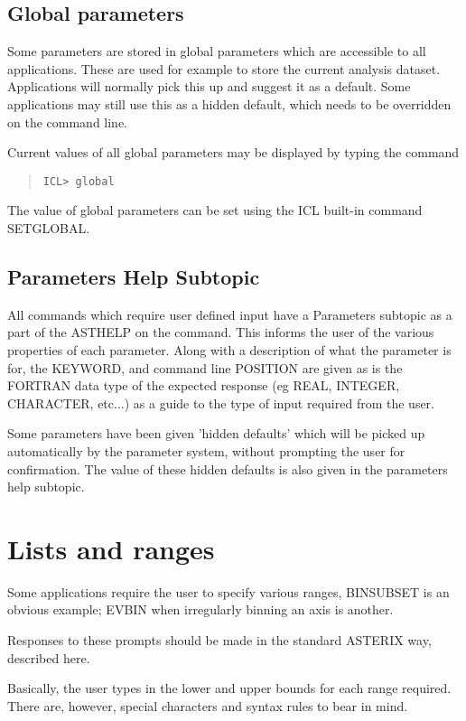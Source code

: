 \documentclass{book}
\renewcommand{\_}{{\tt\char'137}}     %
\begin{document}
\subsection{Global parameters}
Some parameters are stored in global parameters which are
accessible to all applications. These are used for example to
store the current analysis dataset. Applications will normally
pick this up and suggest it as a default. Some applications may
still use this as a hidden default, which needs to be overridden
on the command line.
 
Current values of all global parameters may be displayed by
typing the command
 
\begin{quote}\begin{verbatim}
ICL> global
\end{verbatim}\end{quote}
The value of global parameters can be set using the ICL built-in
command SETGLOBAL.
 
\subsection{Parameters Help Subtopic}
All commands which require user defined input have a Parameters
subtopic as a part of the ASTHELP on the command. This informs
the user of the various properties of each parameter. Along with
a description of what the parameter is for, the KEYWORD, and
command line POSITION are given as is the FORTRAN data type of
the expected response (eg REAL, INTEGER, CHARACTER, etc...) as a
guide to the type of input required from the user.
 
Some parameters have been given 'hidden defaults' which will be
picked up automatically by the parameter system, without
prompting the user for confirmation. The value of these hidden
defaults is also given in the parameters help subtopic.
 
\section{Lists and ranges}
Some applications require the user to specify various ranges,
BINSUBSET is an obvious example; EVBIN when irregularly binning
an axis is another.
 
Responses to these prompts should be made in the standard ASTERIX
way, described here.
 
Basically, the user types in the lower and upper bounds for each
range required. There are, however, special characters and syntax
rules to bear in mind.
 
\end{document}
